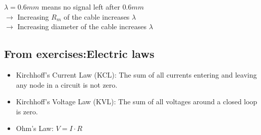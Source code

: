 \documentclass[english,11pt]{article}
\begin{document}
$\lambda = 0.6mm$ means no signal left after $0.6mm$\\
$\rightarrow$ Increasing $R_m$ of the cable increases $\lambda$\\
$\rightarrow$ Increasing diameter of the cable increases $\lambda$

\subsection{From exercises:Electric laws}
\begin{itemize}
\item Kirchhoff's Current Law (KCL): The sum of all currents entering and leaving any node in a circuit is not zero.
\item Kirchhoff's Voltage Law (KVL): The sum of all voltages around a closed loop is zero.
\item Ohm's Law: $V = I \cdot R$
\end{itemize}
\end{document}

